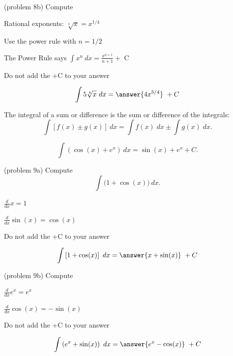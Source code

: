 \documentclass[handout]{ximera}
\begin{document}
\begin{problem}(problem 8b)
Compute 


\begin{hint}
Rational exponents: $\sqrt[4]x = x^{1/4}$
\end{hint}
\begin{hint}
Use the power rule with $n=1/2$
\end{hint}
\begin{hint}
The Power Rule says $\int x^n \ dx = \frac{x^{n+1}}{n+1} +$ C
\end{hint}
\begin{hint}
Do not add the +C to your answer
\end{hint}

\[
\int 5\sqrt[4]x \ dx =
\answer{4x^{5/4}} \ + C
\]
\end{problem}



\begin{theorem}
The integral of a sum or difference is the sum or difference of the integrals:
\[
\int \left[f(x)\pm g(x)\right] \ dx = \int f(x) \; dx  \pm  \int g(x) \; dx.
\]
\end{theorem}



\begin{example}[example 9]
\[
\int \left(\cos(x) + e^x\right) \ dx = \sin(x) + e^x + C.
\]
\end{example}

\begin{problem}(problem 9a)
Compute
\[
\int \big(1 + \cos(x) \big) \ dx.
\]

\begin{hint}
$\frac{d}{dx} x = 1$
\end{hint}
\begin{hint}
$\frac{d}{dx} \sin(x) = \cos(x)$
\end{hint}
\begin{hint}
Do not add the +C to your answer
\end{hint}

\[
\int \left[1 + \cos(x) \right] \ dx =
\answer{x + \sin(x)} \ +  C
\]
\end{problem}


\begin{problem}(problem 9b)
Compute

\begin{hint}
$\frac{d}{dx} e^x = e^x$
\end{hint}
\begin{hint}
$\frac{d}{dx} \cos(x) = -\sin(x)$
\end{hint}
\begin{hint}
Do not add the +C to your answer
\end{hint}

\[
\int \left(e^x + \sin(x) \right) \ dx =
\answer{e^x -\cos(x)} \ +  C
\]
\end{problem}
\end{document}
